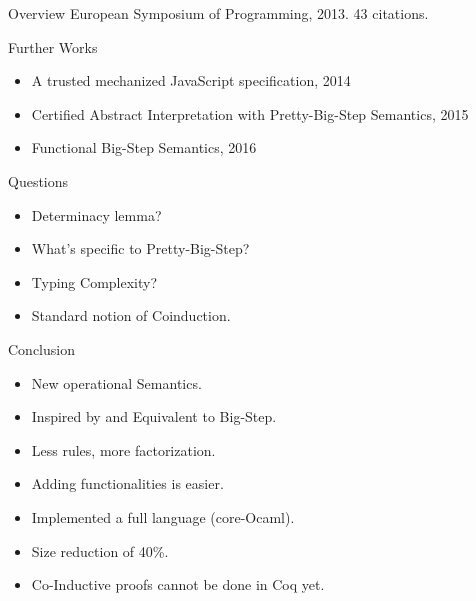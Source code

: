 \documentclass[page number,dvipsnames]{beamer}
\begin{document}
\begin{frame}{Overview}
  European Symposium of Programming, 2013. 43 citations.
  \vfill
  \begin{exampleblock}{Further Works}
    \begin{itemize}
    \item A trusted mechanized JavaScript specification, 2014
    \item Certified Abstract Interpretation with Pretty-Big-Step Semantics, 2015
    \item Functional Big-Step Semantics, 2016
    \end{itemize}
  \end{exampleblock}
  \vfill
  \begin{alertblock}{Questions}
    \begin{itemize}
    \item Determinacy lemma?
    \item What's specific to Pretty-Big-Step?
    \item Typing Complexity?
    \item Standard notion of Coinduction.
    \end{itemize}
  \end{alertblock}

\end{frame}

\begin{frame}{Conclusion}
  \begin{itemize}
  \item New operational Semantics.
  \item Inspired by and Equivalent to Big-Step.
  \item Less rules, more factorization.
  \item Adding functionalities is easier.
  \item Implemented a full language (core-Ocaml).
  \item Size reduction of 40\%.
  \item Co-Inductive proofs cannot be done in Coq yet.
  \end{itemize}
\end{frame}
\end{document}
